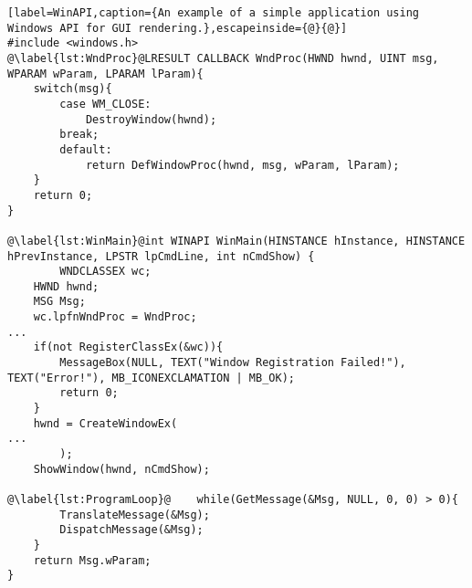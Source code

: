 \begin{lstlisting}[label=WinAPI,caption={An example of a simple application using Windows API for GUI rendering.},escapeinside={@}{@}]
#include <windows.h>
@\label{lst:WndProc}@LRESULT CALLBACK WndProc(HWND hwnd, UINT msg, WPARAM wParam, LPARAM lParam){
    switch(msg){
        case WM_CLOSE:
            DestroyWindow(hwnd);
        break;
        default:
            return DefWindowProc(hwnd, msg, wParam, lParam);
    }
    return 0;
}

@\label{lst:WinMain}@int WINAPI WinMain(HINSTANCE hInstance, HINSTANCE hPrevInstance, LPSTR lpCmdLine, int nCmdShow) {
		WNDCLASSEX wc;
    HWND hwnd;
    MSG Msg;
    wc.lpfnWndProc = WndProc;    
...
    if(not RegisterClassEx(&wc)){
        MessageBox(NULL, TEXT("Window Registration Failed!"), TEXT("Error!"), MB_ICONEXCLAMATION | MB_OK);
        return 0;
    }
    hwnd = CreateWindowEx(
...
		);
    ShowWindow(hwnd, nCmdShow);

@\label{lst:ProgramLoop}@    while(GetMessage(&Msg, NULL, 0, 0) > 0){
        TranslateMessage(&Msg);
        DispatchMessage(&Msg);
    }
    return Msg.wParam;
}
\end{lstlisting}
